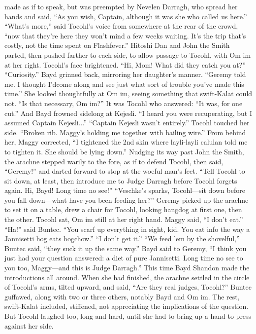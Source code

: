 \documentclass[9pt]{article}
\begin{document}
made as if to speak, but was preempted by Nevelen Darragh, who spread her hands and said, “As you
wish, Captain, although it was she who called us here.”
“What’s more,” said Tocohl’s voice from somewhere at the rear of the crowd, “now that they’re
here they won’t mind a few weeks waiting. It’s the trip that’s costly, not the time spent on Flashfever.”
Hitoshi Dan and John the Smith parted, then pushed farther to each side, to allow passage to Tocohl,
with Om im at her right. Tocohl’s face brightened. “Hi, Mom! What did they catch you at?”
“Curiosity.” Bayd grinned back, mirroring her daughter’s manner. “Geremy told me. I thought I’dcome along and see just what sort of trouble you’ve made this time.” She looked thoughtfully at Om im,
seeing something that swift-Kalat could not. “Is that necessary, Om im?”
It was Tocohl who answered: “It was, for one cut.” And Bayd frowned sidelong at Kejesli. “I heard
you were recuperating, but I assumed Captain Kejesli...”
“Captain Kejesli wasn’t entirely.” Tocohl touched her side. “Broken rib. Maggy’s holding me
together with bailing wire.”
From behind her, Maggy corrected, “I tightened the 2nd skin where layli-layli calulan told me to
tighten it. She should be lying down.” Nudging its way past John the Smith, the arachne stepped warily to
the fore, as if to defend Tocohl, then said, “Geremy!” and darted forward to stop at the woeful man’s
feet. “Tell Tocohl to sit down, at least, then introduce me to Judge Darragh before Tocohl forgets again.
Hi, Bayd! Long time no see!”
“Veschke’s sparks, Tocohl—sit down before you fall down—what have you been feeding her?”
Geremy picked up the arachne to set it on a table, drew a chair for Tocohl, looking hangdog at first one,
then the other. Tocohl sat, Om im still at her right hand.
Maggy said, “I don’t eat.”
“Ha!” said Buntec. “You scarf up everything in sight, kid. You eat info the way a Jannisetti hog eats
hogchow.”
“I don’t get it.”
“We feed ’em by the shovelful,” Buntec said, “they suck it up the same way.”
Bayd said to Geremy, “I think you just had your question answered: a diet of pure Jannisetti. Long
time no see to you too, Maggy—and this is Judge Darragh.” This time Bayd Shandon made the
introductions all around.
When she had finished, the arachne settled in the circle of Tocohl’s arms, tilted upward, and said,
“Are they real judges, Tocohl?”
Buntec guffawed, along with two or three others, notably Bayd and Om im. The rest, swift-Kalat
included, stiffened, not appreciating the implications of the question. But Tocohl laughed too, long and
hard, until she had to bring up a hand to press against her side.
\end{document}
